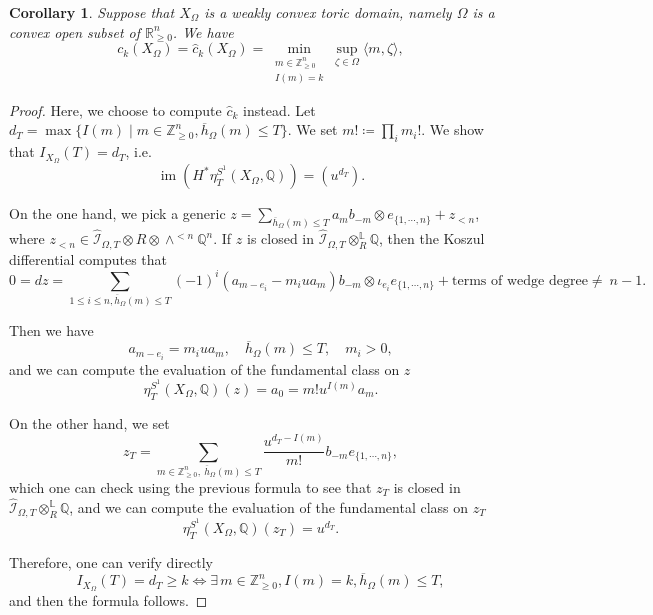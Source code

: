 \documentclass[11pt]{amsart}
\numberwithin{equation}{section}
\theoremstyle{plain}
\newtheorem{Coro}[coro]{Corollary}
\theoremstyle{definition}
\theoremstyle{remark}
\newcommand{\bQ} { {\mathbb{Q}}}
\newcommand{\bZ} { {\mathbb{Z}}}
\newcommand\im{ {\operatorname{im}} }
\begin{document}
\begin{Coro}\label{coro: capacity weakly convex toric}Suppose that $X_{\Omega}$ is a weakly convex toric domain, namely $\Omega$ is a convex open subset of $\mathbb R_{\geq 0}^n$. We have
\[
 {c}_k(X_{\Omega})=\widehat{c}_k(X_{\Omega})
=
\min_{\substack{m\in\bZ_{\geq 0}^n\\ I(m)=k}} \sup_{\zeta\in \Omega}\langle m,\zeta\rangle,
\] \end{Coro}
\begin{proof}Here, we choose to compute $\widehat{c}_k$ instead. Let $d_T=\max\{I(m)\mid m\in \bZ^n_{\geq 0},\overline{h}_\Omega(m)\leq T\}$. We set $m!\coloneqq \prod_i m_i!$. 
We show that $I_{X_{\Omega}}(T)=d_T$, i.e.
\[\im (H^*\eta_T^{S^1}(X_\Omega, \bQ))=(u^{d_T}).\]

On the one hand, we pick a generic $z=\sum_{\overline{h}_\Omega(m)\leq T}a_mb_{-m} \otimes e_{\{1,\cdots,n\}}+z_{<n}$, where $z_{<n} \in \widehat{\mathcal{I}}_{\Omega,T} \otimes R \otimes \wedge^{<n}\bQ^n$. If $z$ is closed in $\widehat{\mathcal{I}}_{\Omega,T}\otimes^\mathbb{L}_R\bQ$, then the Koszul differential computes that
\[0=dz=\sum_{1\leq i\leq n,\overline{h}_\Omega(m)\leq T} (-1)^i(a_{m-e_i}-m_iua_m)b_{-m} \otimes \iota_{e_i} e_{\{1,\cdots,n\}}+\text{terms of wedge degree}\neq ~n-1.\]

Then we have
\[a_{m-e_i}=m_iua_m,\quad \overline{h}_\Omega(m)\leq T,\quad m_i>0,\]
and we can compute the evaluation of the fundamental class on $z$
\[\eta_T^{S^1}(X_\Omega, \bQ)(z)=a_0=m!u^{I(m)}a_m.\]

On the other hand, we set
\[z_T=\sum_{m\in \bZ^n_{\geq 0},~\overline{h}_\Omega(m)\leq T}\frac{u^{d_T-I(m)}}{m!}b_{-m}e_{\{1,\cdots,n\}},\]
which one can check using the previous formula to see that $z_T$ is closed in $\widehat{\mathcal{I}}_{\Omega,T}\otimes^\mathbb{L}_R\bQ$, and we can compute the evaluation of the fundamental class on $z_T$
\[\eta_T^{S^1}(X_\Omega, \bQ)(z_T)=u^{d_T}.\]

Therefore, one can verify directly 
\[  I_{X_\Omega}(T)=d_T\geq k \iff \exists\, m\in \bZ^n_{\geq 0}, I(m)=k,\overline{h}_\Omega(m)\leq T,\]
and then the formula follows. \end{proof}
\end{document}
